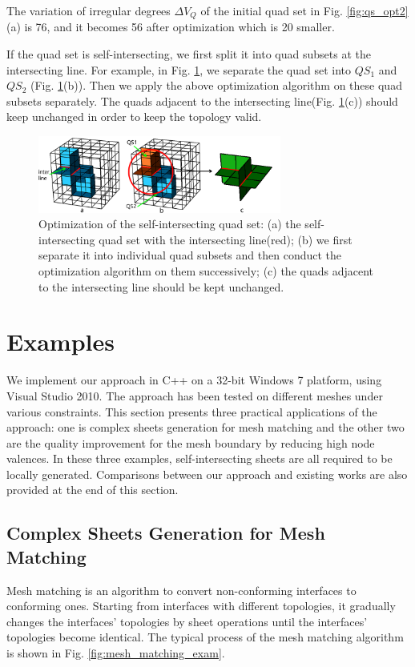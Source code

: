 \documentclass[final,5p,times,twocolumn]{elsarticle}
\begin{document}
The variation of irregular degrees $\Delta V_Q$ of the initial quad set in Fig. \ref{fig:qs_opt2}(a) is 76, and it becomes 56 after optimization which is 20 smaller.

If the quad set is self-intersecting, we first split it into quad subsets at the intersecting line. For example, in Fig. \ref{fig:opt_int_quad_sets}, we separate the quad set into $QS_1$ and $QS_2$ (Fig. \ref{fig:opt_int_quad_sets}(b)). Then we apply the above optimization algorithm on these quad subsets separately. The quads adjacent to the intersecting line(Fig. \ref{fig:opt_int_quad_sets}(c)) should keep unchanged in order to keep the topology valid.

\begin{figure}[htbp]
\begin{center}
\includegraphics[width=8cm]{opt_int_quad_sets.png}
\caption{Optimization of the self-intersecting quad set: (a) the self-intersecting quad set with the intersecting line(red); (b) we first separate it into individual quad subsets and then conduct the optimization algorithm on them successively; (c) the quads adjacent to the intersecting line should be kept unchanged.}
\label{fig:opt_int_quad_sets}
\end{center}
\end{figure}

\section{Examples}
\label{sec:examples}
We implement our approach in C++ on a 32-bit Windows 7 platform, using Visual Studio 2010. The approach has been tested on different meshes under various constraints. This section presents three practical applications of the approach: one is complex sheets generation for mesh matching and the other two are the quality improvement for the mesh boundary by reducing high node valences. In these three examples, self-intersecting sheets are all required to be locally generated. Comparisons between our approach and existing works are also provided at the end of this section.

\subsection{Complex Sheets Generation for Mesh Matching}
\label{sec:mesh_matching}
Mesh matching is an algorithm to convert non-conforming interfaces to conforming ones\cite{Chen:2015kf,Staten2010d}. Starting from interfaces with different topologies, it gradually changes the interfaces' topologies by sheet operations until the interfaces' topologies become identical. The typical process of the mesh matching algorithm is shown in Fig. \ref{fig:mesh_matching_exam}.
\end{document}
